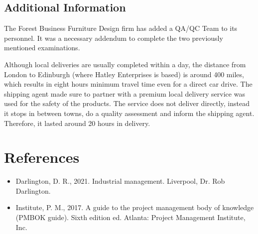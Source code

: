 \subsection{Additional Information}
The Forest Business Furniture Design firm has added a QA/QC Team to its personnel.
It was a necessary addendum to complete the two previously mentioned examinations.


Although local deliveries are usually completed within a day, the distance from London
to Edinburgh (where Hatley Enterprises is based) is around 400 miles, which results in eight
hours minimum travel time even for a direct car drive. The shipping agent made sure to partner
with a premium local delivery service was used for the safety of the products. The service does
not deliver directly, instead it stops in between towns, do a quality assessment and inform the
shipping agent. Therefore, it lasted around 20 hours in delivery.
\newpage
\section*{References}
\begin{itemize}
    \item Darlington, D. R., 2021. Industrial management. Liverpool, Dr. Rob Darlington.
    \item Institute, P. M., 2017. A guide to the project management body of knowledge (PMBOK
          guide). Sixth edition ed. Atlanta: Project Management Institute, Inc.
\end{itemize}
